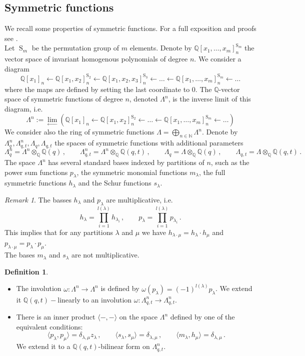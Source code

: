 \documentclass[12pt,a4paper]{amsart}
\theoremstyle{plain}
\theoremstyle{definition}
\newtheorem{df}[tw]{Definition}
\theoremstyle{remark}
\newtheorem{rem}[tw]{Remark}
\newcommand{\Perm}{\operatorname{S}}
\newcommand{\NN}{\mathbb{N}}
\newcommand{\QQ}{\mathbb{Q}}
\begin{document}
\subsection{Symmetric functions} \label{s:sym}
We recall some properties of symmetric functions. For a full exposition and proofs see \cite{Macdonald}. \\
Let $\Perm_m$ be the permutation group of $m$ elements. Denote by $\QQ[x_1,\dots, x_m]_n^{\Perm_m}$ the vector space of invariant homogenous polynomials of degree $n$. We consider a diagram
$$
\QQ[x_1]_n \leftarrow
\QQ[x_1,x_2]^{\Perm_2}_n \leftarrow
\QQ[x_1,x_2,x_3]^{\Perm_3}_n \leftarrow
\dots \leftarrow
\QQ[x_1,\dots, x_m]_n^{\Perm_m} \leftarrow \dots
$$
where the maps are defined by setting the last coordinate to $0$. The $\QQ$-vector space of symmetric functions of degree $n$, denoted $\Lambda^n$, is the inverse limit of this diagram, i.e.
$$\Lambda^n:=\lim\limits_{\leftarrow} (\QQ[x_1]_n \leftarrow
\QQ[x_1,x_2]^{\Perm_2}_n \leftarrow
\dots \leftarrow
\QQ[x_1,\dots, x_m]_n^{\Perm_m} \leftarrow \dots)
$$
We consider also the ring of symmetric functions $\Lambda=\bigoplus_{n\in \NN} \Lambda^n$. Denote by $\Lambda_q^n,\Lambda_{q,t}^n,\Lambda_q,\Lambda_{q,t}$ the spaces of symmetric functions with additional parameters
$$
\Lambda_q^n=\Lambda^n\otimes_\QQ \QQ(q)\,, \qquad
\Lambda_{q,t}^n=\Lambda^n\otimes_\QQ \QQ(q,t)\,, \qquad
\Lambda_q=\Lambda\otimes_\QQ \QQ(q)\,, \qquad \Lambda_{q,t}=\Lambda\otimes_\QQ \QQ(q,t)\,.
$$
The space $\Lambda^n$ has several standard bases indexed by partitions of $n$, such as the power sum functions $p_{\lambda}$, the symmetric monomial functions $m_\lambda$, the full symmetric functions $h_\lambda$ and the Schur functions $s_\lambda$.
\begin{rem}
	The basses $h_\lambda$ and $p_{\lambda}$ are multiplicative, i.e.
	$$
	h_\lambda=\prod_{i=1}^{l(\lambda)} h_{\lambda_i}\,, \qquad
	p_\lambda=\prod_{i=1}^{l(\lambda)} p_{\lambda_i}\,.
	$$
	This implies that for any partitions $\lambda$ and $\mu$ we have $h_{\lambda\cdot\mu}=h_\lambda\cdot h_\mu$ and $p_{\lambda\cdot\mu}=p_\lambda\cdot p_\mu$. \\
	The bases $m_\lambda$ and $s_\lambda$ are not multiplicative.
\end{rem} 
\begin{df} \label{df:w}
	\begin{itemize}
		\item The involution $\omega:\Lambda^n\to \Lambda^n$ is defined by $\omega (p_\lambda)=(-1)^{l(\lambda)}p_\lambda$. We extend it $\QQ(q,t)-$linearly to an involution $\omega:\Lambda_{q,t}^n\to \Lambda_{q,t}^n$.
		\item There is an inner product $\langle -,-\rangle$ on the space $\Lambda^n$  defined by one of the equivalent conditions:
		$$\langle p_\lambda,p_\mu\rangle=\delta_{\lambda,\mu}z_\lambda\,, \qquad \langle s_\lambda,s_\mu\rangle=\delta_{\lambda,\mu}
		\,, \qquad \langle m_\lambda,h_\mu\rangle=\delta_{\lambda,\mu}
		\,.$$
		We extend it to a $\QQ(q,t)$-bilinear form on $\Lambda^n_{q,t}$.
	\end{itemize}
\end{df}
\end{document}
